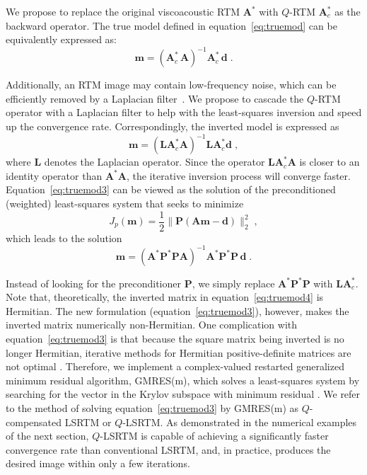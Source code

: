 We propose to replace the original viscoacoustic RTM $\mathbf{A}^*$ with $Q$-RTM $\mathbf{A}^*_c$ as the backward operator. The true model defined in equation~\ref{eq:truemod} can be equivalently expressed as:
\begin{equation}
  \label{eq:truemod2}
\mathbf{m} = (\mathbf{A}^*_c \, \mathbf{A})^{-1}\mathbf{A}^*_c \, \mathbf{d} \; .
\end{equation}

Additionally, an RTM image may contain low-frequency noise, which can be efficiently removed by a Laplacian filter~\cite[]{zhang09prac}. We propose to cascade the $Q$-RTM operator with a Laplacian filter to help with the least-squares inversion and speed up the convergence rate. Correspondingly, the inverted model is expressed as
\begin{equation}
  \label{eq:truemod3}
\mathbf{m} = (\mathbf{L}\mathbf{A}^*_c\mathbf{A})^{-1} \mathbf{L}\mathbf{A}^*_c \mathbf{d}\;,
\end{equation}
where $\mathbf{L}$ denotes the Laplacian operator. Since the operator $\mathbf{L}\mathbf{A}^*_c\mathbf{A}$ is closer to an identity operator than $\mathbf{A}^*\mathbf{A}$, the iterative inversion process will converge faster. Equation~\ref{eq:truemod3} can be viewed as the solution of the preconditioned (weighted) least-squares system that seeks to minimize
\begin{equation}
  \label{eq:pls}
J_p(\mathbf{m}) = \frac{1}{2}\| \mathbf{P} (\mathbf{A} \mathbf{m} - \mathbf{d}) \|^2_2 \; ,
\end{equation}
which leads to the solution
\begin{equation}
  \label{eq:truemod4}
\mathbf{m} = (\mathbf{A}^* \mathbf{P}^* \mathbf{P} \mathbf{A})^{-1} \mathbf{A}^* \mathbf{P}^* \mathbf{P} \, \mathbf{d} \;.
\end{equation}

Instead of looking for the preconditioner $\mathbf{P}$, we simply replace $\mathbf{A}^* \mathbf{P}^* \mathbf{P}$ with $\mathbf{L} \mathbf{A}^*_c$. Note that, theoretically, the inverted matrix in equation~\ref{eq:truemod4} is Hermitian. The new formulation (equation~\ref{eq:truemod3}), however, makes the inverted matrix numerically non-Hermitian. One complication with equation~\ref{eq:truemod3} is that because the square matrix being inverted is no longer Hermitian, iterative methods for Hermitian positive-definite matrices are not optimal \cite[]{saad2003iterative}. Therefore, we implement a complex-valued restarted generalized minimum residual algorithm, GMRES(m), which solves a least-squares system by searching for the vector in the Krylov subspace with minimum residual \cite[]{saad1986gmres}. We refer to the method of solving equation~\ref{eq:truemod3} by GMRES(m) as $Q$-compensated LSRTM or $Q$-LSRTM. As demonstrated in the numerical examples of the next section, $Q$-LSRTM is capable of achieving a significantly faster convergence rate than conventional LSRTM, and, in practice, produces the desired image within only a few iterations.

